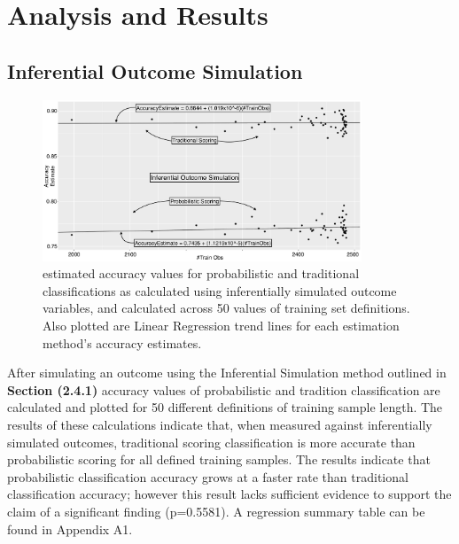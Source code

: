 \documentclass[12pt,]{article}
\begin{document}
\hypertarget{analysis-and-results}{%
\section{Analysis and Results}\label{analysis-and-results}}

\hypertarget{inferential-outcome-simulation}{%
\subsection{Inferential Outcome
Simulation}\label{inferential-outcome-simulation}}

\begin{figure}[h!]
\begin{center}
\includegraphics[width=0.85\textwidth]{Sup1Graph.jpg}
\end{center}
\caption[Inferential Outcome Simulation Result Plot]{estimated accuracy values for probabilistic and traditional classifications as calculated using inferentially simulated outcome variables, and calculated across 50 values of training set definitions.  Also plotted are Linear Regression trend lines for each estimation method's accuracy estimates.}
\end{figure}

After simulating an outcome using the Inferential Simulation method
outlined in \textbf{Section (2.4.1)} accuracy values of probabilistic
and tradition classification are calculated and plotted for 50 different
definitions of training sample length. The results of these calculations
indicate that, when measured against inferentially simulated outcomes,
traditional scoring classification is more accurate than probabilistic
scoring for all defined training samples. The results indicate that
probabilistic classification accuracy grows at a faster rate than
traditional classification accuracy; however this result lacks
sufficient evidence to support the claim of a significant finding
(p=0.5581). A regression summary table can be found in Appendix A1.
\end{document}
